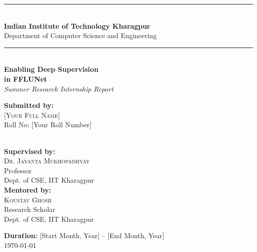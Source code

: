 \documentclass[12pt,a4paper]{report}
\begin{document}
\begin{titlepage}
\begin{center}
    \vspace*{0.5cm}

    \rule{\linewidth}{0.5mm}\\[0.3cm]

    {\LARGE \bfseries Indian Institute of Technology Kharagpur}\\[0.2cm]
    {\large Department of Computer Science and Engineering}\\[0.1cm]
    \rule{\linewidth}{0.5mm}\\[1.2cm]

    {\Huge \bfseries Enabling Deep Supervision\\[0.3cm] in FFLUNet}\\[0.8cm]

    {\Large \textit{Summer Research Internship Report}}\\[1.8cm]

    \begin{minipage}[t]{0.47\textwidth}
        \begin{flushleft}
            \large
            \textbf{Submitted by:}\\[0.3cm]
            \textsc{[Your Full Name]}\\
            Roll No: [Your Roll Number]\\
            [Your Institution / Department]\\
            [Your University]
        \end{flushleft}
    \end{minipage}
    \hfill
    \begin{minipage}[t]{0.47\textwidth}
        \begin{flushright}
            \large
            \textbf{Supervised by:}\\[0.3cm]
            \textsc{Dr. Jayanta Mukhopadhyay}\\
            Professor\\
            Dept. of CSE, IIT Kharagpur\\[0.5cm]
            \textbf{Mentored by:}\\[0.2cm]
            \textsc{Koustav Ghosh}\\
            Research Scholar\\
            Dept. of CSE, IIT Kharagpur
        \end{flushright}
    \end{minipage}

    \vfill

    {\large \textbf{Duration:} [Start Month, Year] -- [End Month, Year]}\\[0.3cm]
    {\large \today}
\end{center}
\end{titlepage}
\end{document}
